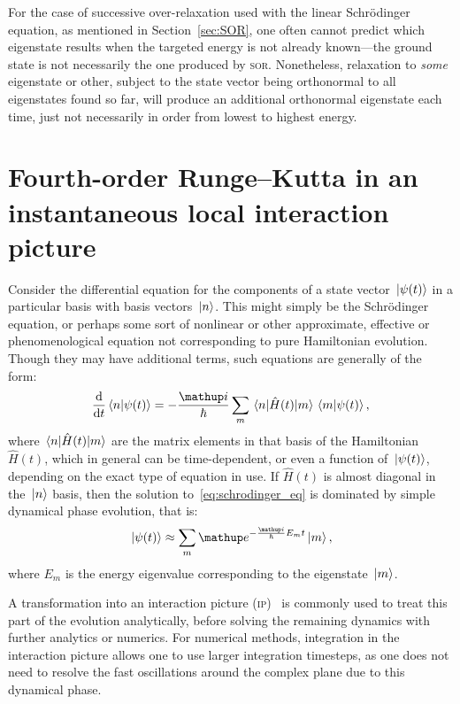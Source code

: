 For the case of successive over-relaxation used with the linear Schr\"odinger equation, as mentioned in Section~\ref{sec:SOR}, one often cannot predict which eigenstate results when the targeted energy is not already known---the ground state is not necessarily the one produced by \textsc{sor}. Nonetheless, relaxation to \emph{some} eigenstate or other, subject to the state vector being orthonormal to all eigenstates found so far, will produce an additional orthonormal eigenstate each time, just not necessarily in order from lowest to highest energy.

\section{Fourth-order Runge--Kutta in an instantaneous local interaction picture}\label{sec:rk4ilip}


Consider the differential equation for the components of a state vector $\ket{\psi(t)}$ in a particular basis with basis vectors $\ket{n}$. This might simply be the Schr\"odinger equation, or perhaps some sort of nonlinear or other approximate, effective or phenomenological equation not corresponding to pure Hamiltonian evolution. Though they may have additional terms, such equations are generally of the form:
\begin{align}\label{eq:schrodinger_eq}
\dv t \braket{n}{\psi(t)} = -\frac \ii \hbar \sum_m \matrixel{n}{\hat H(t)}{m} \braket{m}{\psi(t)},
\end{align}
where $\matrixel{n}{\hat H(t)}{m}$ are the matrix elements in that basis of the Hamiltonian $\hat H(t)$, which in general can be time-dependent, or even a function of $\ket{\psi(t)}$, depending on the exact type of equation in use. If $\hat H(t)$ is almost diagonal in the $\ket{n}$ basis, then the solution to~\eqref{eq:schrodinger_eq} is dominated by simple dynamical phase evolution, that is:
\begin{align}
\ket{\psi(t)} \approx \sum_m \ee^{-\frac \ii \hbar E_m t}\ket{m},
\end{align}
where $E_m$ is the energy eigenvalue corresponding to the eigenstate $\ket{m}$.

A transformation into an interaction picture (\textsc{ip})~\cite[p.~317]{sakurai} is commonly used to treat this part of the evolution analytically, before solving the remaining dynamics with further analytics or numerics. For numerical methods, integration in the interaction picture allows one to use larger integration timesteps, as one does not need to resolve the fast oscillations around the complex plane due to this dynamical phase.

